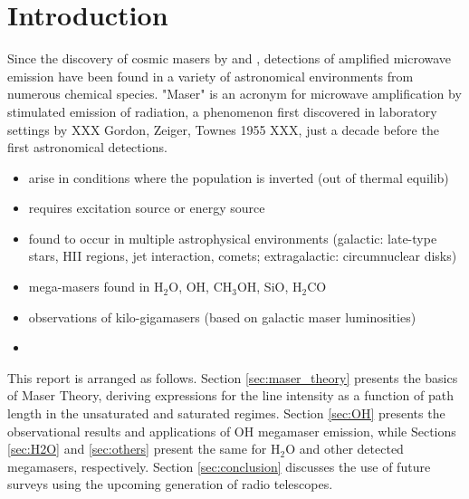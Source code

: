 \section{Introduction}
\label{sec:intro}

Since the discovery of cosmic masers by \citet{gundermann1965} and \citet{WEAVER_1965}, detections of amplified microwave emission have been found in a variety of astronomical environments from numerous chemical species. "Maser" is an acronym for microwave amplification by stimulated emission of radiation, a phenomenon first discovered in laboratory settings by XXX Gordon, Zeiger, Townes 1955 XXX, just a decade before the first astronomical detections.



\begin{itemize}
\item arise in conditions where the population is inverted (out of thermal equilib)
\item requires excitation source or energy source
\item found to occur in multiple astrophysical environments (galactic: late-type stars, HII regions, jet interaction, comets; extragalactic: circumnuclear disks)
\item mega-masers found in H$_2$O, OH, CH$_3$OH, SiO, H$_2$CO
\item observations of kilo-gigamasers (based on galactic maser luminosities)
\item 
\end{itemize}

This report is arranged as follows. Section \ref{sec:maser_theory} presents the basics of Maser Theory, deriving expressions for the line intensity as a function of path length in the unsaturated and saturated regimes. Section \ref{sec:OH} presents the observational results and applications of OH megamaser emission, while Sections \ref{sec:H2O} and \ref{sec:others} present the same for H$_2$O and other detected megamasers, respectively. Section \ref{sec:conclusion} discusses the use of future surveys using the upcoming generation of radio telescopes.